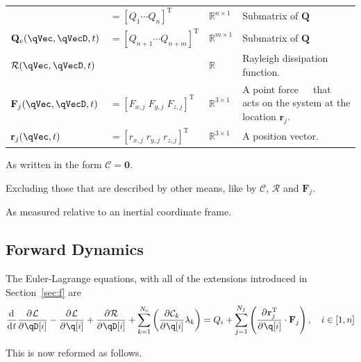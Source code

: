 \documentclass[11pt]{article}
\renewcommand{\secref}[1]{Section~\ref{#1}}
\newcommand{\oD}[2]{
    \frac{\mathrm{d}\mspace{1mu}#1}{\mathrm{d}\mspace{1mu}#2}
}
\newcommand{\pD}[2]{
    \frac{\partial\mspace{1mu}#1}{\partial\mspace{1mu}#2}
}
\begin{document}
\begin{center}
\begin{threeparttable}
\begin{tabular}{llll}
        & $=[Q_1 \cdots Q_{n}]^{\mathrm{T}}$
        & $\mathbb{R}^{n\times1}$
        & Submatrix of $\mathbf{Q}$ \\
    $\mathbf{Q}_e(\qVec, \qVecD, t)$
        & $=[Q_{n+1} \cdots Q_{n+m}]^{\mathrm{T}}$
        & $\mathbb{R}^{m\times1}$
        & Submatrix of $\mathbf{Q}$ \\
    $\mathcal{R}(\qVec, \qVecD, t)$
        &
        & $\mathbb{R}$
        & Rayleigh dissipation function. \\
    $\mathbf{F}_j(\qVec, \qVecD, t)$
        & $=[F_{x,j} \; F_{y,j} \; F_{z,j}]^{\mathrm{T}}$
        & $\mathbb{R}^{3\times1}$
        & A point force\tnote{3}\ \ \ that acts on the system at the location $\mathbf{r}_j$. \\
    $\mathbf{r}_j(\qVec, t)$
        & $=[r_{x,j} \; r_{y,j} \; r_{z,j}]^{\mathrm{T}}$
        & $\mathbb{R}^{3\times1}$
        & A position vector\tnote{3}. \\
\end{tabular}
\begin{tablenotes}
    \item[1] As written in the form $\bm{\mathcal{C}}=\mathbf{0}$.
    \item[2] Excluding those that are described by other means, like by $\bm{\mathcal{C}}$, $\mathcal{R}$ and $\mathbf{F}_j$.
    \item[3] As measured relative to an inertial coordinate frame.
\end{tablenotes}
\end{threeparttable}
\end{center}



\subsection{Forward Dynamics} \label{ssec:d:fwdDyn}
The Euler-Lagrange equations, with all of the extensions introduced in \secref{sec:f} are
\begin{equation} \label{eq:EL}
    \oD{}{t}\pD{\mathcal{L}}{\qD[i]} 
    - \pD{\mathcal{L}}{\q[i]} + \pD{\mathcal{R}}{\qD[i]}
    + \sum_{k=1}^{N_c} \del{\pD{\mathcal{C}_k}{\q[i]} \lambda_k}
    = Q_i + \sum_{j=1}^{N_f} \del{\pD{\mathbf{r}_j^{\mathrm{T}}}{\q[i]} \cdot \mathbf{F}_j}
    ,\quad i\in[1,n]
\end{equation}

This is now reformed as follows.
\end{document}
